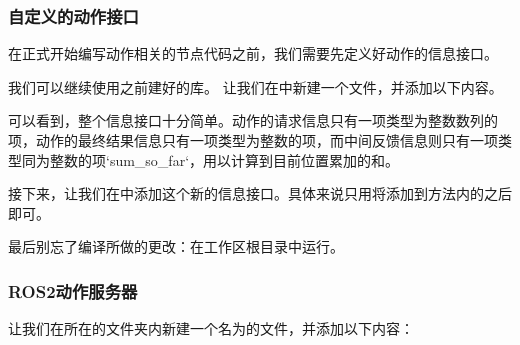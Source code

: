 \documentclass[letterpaper,10pt,english]{sphinxmanual}
\begin{document}
\subsubsection{自定义的动作接口}
\label{\detokenize{chapter_rl_sys/ros_code_ex:id16}}
\sphinxAtStartPar
在正式开始编写动作相关的节点代码之前，我们需要先定义好动作的信息接口。

\sphinxAtStartPar
我们可以继续使用之前建好的库。
让我们在中新建一个文件，并添加以下内容。

\begin{sphinxVerbatim}[commandchars=\\\{\}]
\PYG{p}{[}\PYG{p}{]} 
 
 
\end{sphinxVerbatim}

\sphinxAtStartPar
可以看到，整个信息接口十分简单。动作的请求信息只有一项类型为整数数列的项，动作的最终结果信息只有一项类型为整数的项，而中间反馈信息则只有一项类型同为整数的项`sum\_so\_far`，用以计算到目前位置累加的和。

\sphinxAtStartPar
接下来，让我们在中添加这个新的信息接口。具体来说只用将添加到方法内的之后即可。

\sphinxAtStartPar
最后别忘了编译所做的更改：在工作区根目录中运行。


\subsubsection{ROS2动作服务器}
\label{\detokenize{chapter_rl_sys/ros_code_ex:id17}}
\sphinxAtStartPar
让我们在所在的文件夹内新建一个名为的文件，并添加以下内容：
\end{document}
